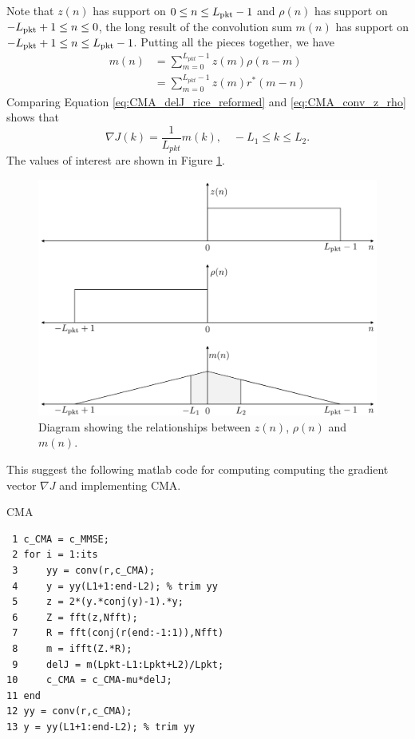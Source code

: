 Note that $z(n)$ has support on $0 \leq n \leq L_\text{pkt}-1$ and 
$\rho(n)$ has support on $-L_\text{pkt}+1 \leq n \leq 0$, 
the long result of the convolution sum $m(n)$ has support on $-L_\text{pkt}+1 \leq n \leq L_\text{pkt}-1$.
Putting all the pieces together, we have
\begin{align}
m(n) &= \sum^{L_{pkt}-1}_{m=0} z(m) \rho(n-m) \nonumber \\
	 &= \sum^{L_{pkt}-1}_{m=0} z(m) r^\ast(m-n)
	 \label{eq:CMA_conv_z_rho}
\end{align}
Comparing Equation \eqref{eq:CMA_delJ_rice_reformed} and \eqref{eq:CMA_conv_z_rho} shows that 
\begin{equation}
\nabla J(k) = \frac{1}{L_{pkt}} m(k), \quad -L_1 \leq k \leq L_2.
\label{eq:CMA_delJ_donzo}
\end{equation}
The values of interest are shown in Figure \ref{fig:convolutionFigureRice}.
\begin{figure}
	\centering\includegraphics[width=10in/100*55]{figures/eq_equations/convolutionFigureRice.pdf}
	\caption{Diagram showing the relationships between $z(n)$, $\rho(n)$ and $m(n)$.}
	\label{fig:convolutionFigureRice}
\end{figure}

This suggest the following matlab code for computing computing the gradient vector $\nabla J$ and implementing CMA.
\begin{table}[h]
\caption{CMA}
\label{code:CMA}
\singlespacing
{\footnotesize
\begin{verbatim}
 1 c_CMA = c_MMSE;
 2 for i = 1:its
 3 	   yy = conv(r,c_CMA);
 4     y = yy(L1+1:end-L2); % trim yy
 5     z = 2*(y.*conj(y)-1).*y;
 6     Z = fft(z,Nfft);
 7     R = fft(conj(r(end:-1:1)),Nfft)
 8     m = ifft(Z.*R);
 9     delJ = m(Lpkt-L1:Lpkt+L2)/Lpkt;
10     c_CMA = c_CMA-mu*delJ;
11 end
12 yy = conv(r,c_CMA);
13 y = yy(L1+1:end-L2); % trim yy
\end{verbatim}
}
\end{table}
\doublespacing


